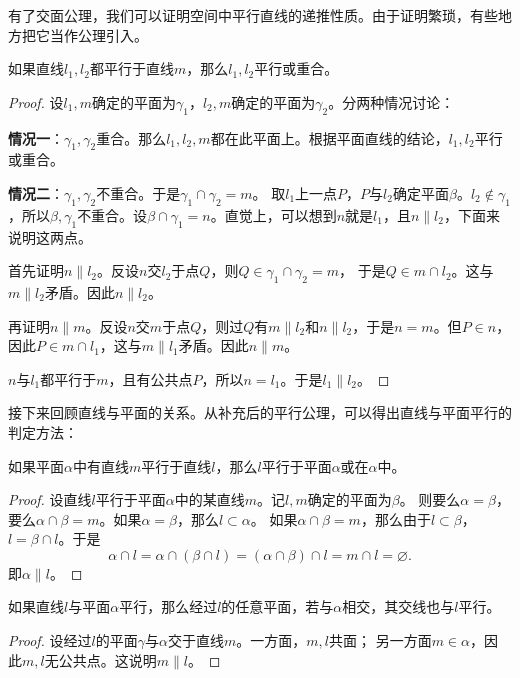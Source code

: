 \documentclass[12pt,UTF8,fontset=none]{ctexbook}
\begin{document}
有了交面公理，我们可以证明空间中平行直线的递推性质。由于证明繁琐，有些地方把它当作公理引入。
\begin{tm}\label{tm:1-0-10}
    如果直线$l_1,l_2$都平行于直线$m$，那么$l_1,l_2$平行或重合。
\end{tm}
\begin{proof}
    设$l_1,m$确定的平面为$\gamma_1$，$l_2,m$确定的平面为$\gamma_2$。分两种情况讨论：

    \textbf{情况一}：$\gamma_1, \gamma_2$重合。那么$l_1,l_2,m$都在此平面上。根据平面直线的结论，$l_1,l_2$平行或重合。
    
    \textbf{情况二}：$\gamma_1, \gamma_2$不重合。于是$\gamma_1\cap \gamma_2 = m$。
    取$l_1$上一点$P$，$P$与$l_2$确定平面$\beta$。$l_2\notin\gamma_1$，所以$\beta,\gamma_1$不重合。设$\beta\cap\gamma_1 = n$。直觉上，可以想到$n$就是$l_1$，且$n\parallel l_2$，下面来说明这两点。
    
    首先证明$n\parallel l_2$。反设$n$交$l_2$于点$Q$，则$Q\in\gamma_1\cap\gamma_2=m$，
    于是$Q\in m\cap l_2$。这与$m\parallel l_2$矛盾。因此$n\parallel l_2$。
    
    再证明$n\parallel m$。反设$n$交$m$于点$Q$，则过$Q$有$m\parallel l_2$和$n\parallel l_2$，于是$n=m$。但$P\in n$，因此$P\in m\cap l_1$，这与$m\parallel l_1$矛盾。因此$n\parallel m$。
    
    $n$与$l_1$都平行于$m$，且有公共点$P$，所以$n = l_1$。于是$l_1\parallel l_2$。

\end{proof}

接下来回顾直线与平面的关系。从补充后的平行公理，可以得出直线与平面平行的判定方法：

\begin{tm}\label{tm:1-0-20}
    如果平面$\alpha$中有直线$m$平行于直线$l$，那么$l$平行于平面$\alpha$或在$\alpha$中。
\end{tm}
\begin{proof}
    设直线$l$平行于平面$\alpha$中的某直线$m$。记$l,m$确定的平面为$\beta$。
    则要么$\alpha = \beta$，要么$\alpha\cap\beta = m$。如果$\alpha=\beta$，那么$l\subset\alpha$。
    如果$\alpha\cap\beta = m$，那么由于$l \subset \beta$，$l = \beta \cap l$。于是
    $$\alpha\cap l = \alpha\cap (\beta \cap l) = (\alpha\cap\beta) \cap l = m\cap l = \varnothing. $$
    即$\alpha \parallel l$。
\end{proof}
\begin{tm}\label{tm:1-0-30}
    如果直线$l$与平面$\alpha$平行，那么经过$l$的任意平面，若与$\alpha$相交，其交线也与$l$平行。
\end{tm}
\begin{proof}
    设经过$l$的平面$\gamma$与$\alpha$交于直线$m$。一方面，$m,l$共面；
    另一方面$m\in\alpha$，因此$m,l$无公共点。这说明$m\parallel l$。
\end{proof}
\end{document}
